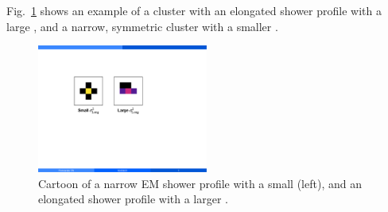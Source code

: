 

Fig.~\ref{fig:sigma_long_shapes} shows an example of a cluster with an elongated shower profile with a large \lambdasquare, and a narrow, symmetric cluster with a smaller \lambdasquare.

\begin{figure}[htpb]
  \centering
  \includegraphics[width=0.5\textwidth]{Data_Analysis/sigma_long_shapes.pdf}
  \caption{Cartoon of a narrow EM shower profile with a small \lambdasquare (left), and an elongated shower profile with a larger \lambdasquare.}
  \label{fig:sigma_long_shapes}
\end{figure}


